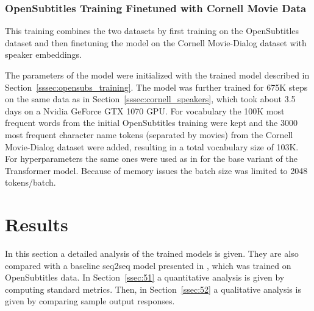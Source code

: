 \documentclass[12pt]{article}
\begin{document}
\subsubsection{OpenSubtitles Training Finetuned with Cornell Movie Data} \label{sssec:finetune_training}
This training combines the two datasets by first training on the OpenSubtitles dataset and then finetuning the model on the Cornell Movie-Dialog dataset with speaker embeddings. 

The parameters of the model were initialized with the trained model described in Section~\ref{sssec:opensubs_training}. The model was further trained for 675K steps on the same data as in Section~\ref{sssec:cornell_speakers}, which took about 3.5 days on a Nvidia GeForce GTX 1070 GPU. For vocabulary the 100K most frequent words from the initial OpenSubtitles training were kept and the 3000 most frequent character name tokens (separated by movies) from the Cornell Movie-Dialog dataset were added, resulting in a total vocabulary size of 103K. For hyperparameters the same ones were used as in \cite{Vaswani:2017} for the base variant of the Transformer model. Because of memory issues the batch size was limited to 2048 tokens/batch.

\newpage\section{Results} \label{sec:results}
In this section a detailed analysis of the trained models is given. They are also compared with a baseline seq2seq model presented in \cite{Vinyals:2015}, which was trained on OpenSubtitles data. In Section~\ref{ssec:51} a quantitative analysis is given by computing standard metrics. Then, in Section~\ref{ssec:52} a qualitative analysis is given by comparing sample output responses.
\end{document}

